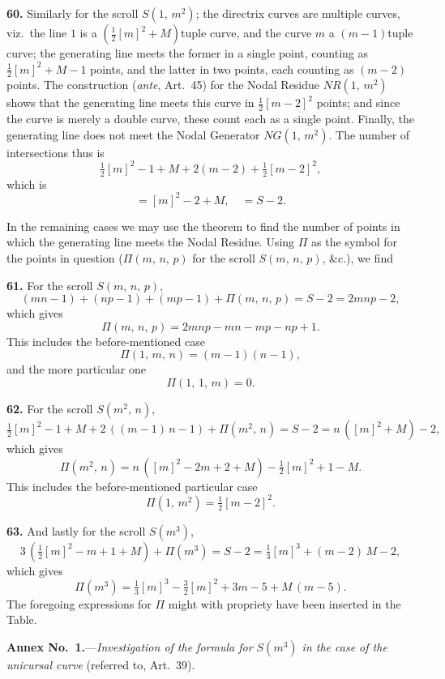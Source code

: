 \documentclass[11pt,a4paper]{article}
\begin{document}
\medskip

\textbf{60.} Similarly for the scroll $S(1,\,m^2)$; the directrix curves are multiple curves, viz.\ the line $1$ is a $(\tfrac{1}{2}[m]^2 + M)$tuple curve, and the curve $m$ a $(m-1)$tuple curve; the generating line meets the former in a single point, counting as $\tfrac{1}{2}[m]^2 + M - 1$ points, and the latter in two points, each counting as $(m-2)$ points. The construction (\textit{ante}, Art.~45) for the Nodal Residue $NR(1,\,m^2)$ shows that the generating line meets this curve in $\tfrac{1}{2}[m-2]^2$ points; and since the curve is merely a double curve, these count each as a single point. Finally, the generating line does not meet the Nodal Generator $NG(1,\,m^2)$. The number of intersections thus is
\[
\tfrac{1}{2}[m]^2 - 1 + M + 2(m-2) + \tfrac{1}{2}[m-2]^2,
\]
which is
\[
= [m]^2 - 2 + M,\quad = S - 2.
\]

\medskip

In the remaining cases we may use the theorem to find the number of points in which the generating line meets the Nodal Residue. Using $\Pi$ as the symbol for the points in question ($\Pi(m,\,n,\,p)$ for the scroll $S(m,\,n,\,p)$, \&c.), we find

\medskip

\textbf{61.} For the scroll $S(m,\,n,\,p)$,
\[
(mn - 1) + (np - 1) + (mp - 1) + \Pi(m,\,n,\,p) = S - 2 = 2mnp - 2,
\]
which gives
\[
\Pi(m,\,n,\,p) = 2mnp - mn - mp - np + 1.
\]
This includes the before-mentioned case
\[
\Pi(1,\,m,\,n) = (m-1)(n-1),
\]
and the more particular one
\[
\Pi(1,\,1,\,m) = 0.
\]

\medskip

\textbf{62.} For the scroll $S(m^2,\,n)$,
\[
\tfrac{1}{2}[m]^2 - 1 + M + 2\,((m-1)\,n - 1) + \Pi(m^2,\,n) = S - 2 = n\,([m]^2 + M) - 2,
\]
which gives
\[
\Pi(m^2,\,n) = n\,([m]^2 - 2m + 2 + M) - \tfrac{1}{2}[m]^2 + 1 - M.
\]
This includes the before-mentioned particular case
\[
\Pi(1,\,m^2) = \tfrac{1}{2}[m-2]^2.
\]

\medskip

\textbf{63.} And lastly for the scroll $S(m^3)$,
\[
3\,(\tfrac{1}{2}[m]^2 - m + 1 + M) + \Pi(m^3) = S - 2 = \tfrac{1}{3}[m]^3 + (m-2)\,M - 2,
\]
which gives
\[
\Pi(m^3) = \tfrac{1}{3}[m]^3 - \tfrac{3}{2}[m]^2 + 3m - 5 + M\,(m - 5).
\]
The foregoing expressions for $\Pi$ might with propriety have been inserted in the Table.

\bigskip

\begin{center}
\textbf{Annex No.~1.}---\textit{Investigation of the formula for $S(m^3)$ in the case of the unicursal curve} (referred to, Art.~39).
\end{center}
\end{document}
